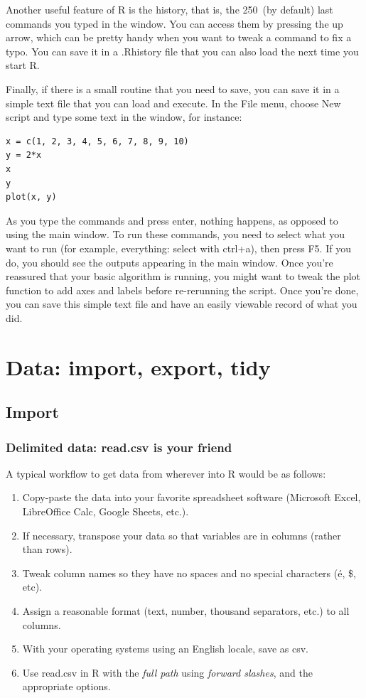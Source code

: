 \documentclass{report}
\newcommand{\code}[1]{\textsf{\ttfamily #1}}
\begin{document}
	Another useful feature of R is the history, that is, the 250~(by default) last commands you typed in the window. You can access them by pressing the up arrow, which can be pretty handy when you want to tweak a command to fix a typo. You can save it in a \code{.Rhistory} file that you can also load the next time you start R.
	
	Finally, if there is a small routine that you need to save, you can save it in a simple text file that you can load and execute. In the \code{File} menu, choose \code{New script} and type some text in the window, for instance:
	\begin{verbatim}
x = c(1, 2, 3, 4, 5, 6, 7, 8, 9, 10)
y = 2*x
x
y
plot(x, y)
	\end{verbatim}
	As you type the commands and press enter, nothing happens, as opposed to using the main window. To run these commands, you need to select what you want to run (for example, everything: select with ctrl+a), then press F5. If you do, you should see the outputs appearing in the main window. Once you're reassured that your basic algorithm is running, you might want to tweak the plot function to add axes and labels before re-rerunning the script. Once you're done, you can save this simple text file and have an easily viewable record of what you did.
	
	\section{Data: import, export, tidy}\label{sec:data-import}	
		\subsection{Import}\label{subsec:import}
		\subsubsection{Delimited data: \code{read.csv} is your friend}
		A typical workflow to get data from wherever into R would be as follows:
		\begin{enumerate}
			\item Copy-paste the data into your favorite spreadsheet software (Microsoft Excel, LibreOffice Calc, Google Sheets, etc.).
			\item If necessary, transpose your data so that variables are in columns (rather than rows).
			\item Tweak column names so they have no spaces and no special characters (é, \$, etc).
			\item Assign a reasonable format (text, number, thousand separators, etc.) to all columns.
			\item With your operating systems using an English locale, save as csv.
			\item Use \code{read.csv} in R with the \emph{full path} using \emph{forward slashes}, and the appropriate options.
		\end{enumerate}
	
\end{document}
